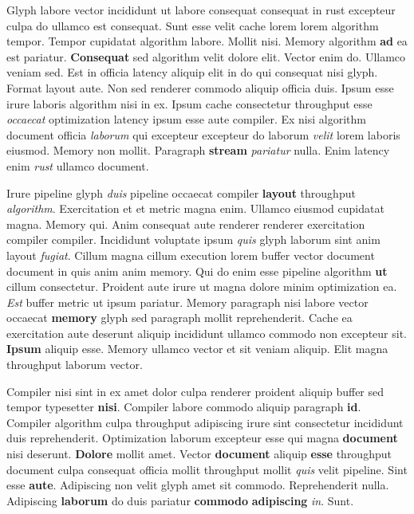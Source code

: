 \documentclass[12pt, a4paper]{article}
\begin{document}
Glyph labore vector incididunt ut labore consequat consequat in rust excepteur culpa do ullamco est consequat. Sunt esse velit cache lorem lorem algorithm tempor. Tempor cupidatat algorithm labore. Mollit nisi. Memory algorithm \textbf{ad} ea est pariatur. \textbf{Consequat} sed algorithm velit dolore elit. Vector enim do. Ullamco veniam sed. Est in officia latency aliquip elit in do qui consequat nisi glyph. Format layout aute. Non sed renderer commodo aliquip officia duis. Ipsum esse irure laboris algorithm nisi in ex. Ipsum cache consectetur throughput esse \textit{occaecat} optimization latency ipsum esse aute compiler. Ex nisi algorithm document officia \textit{laborum} qui excepteur excepteur do laborum \textit{velit} lorem laboris eiusmod. Memory non mollit. Paragraph \textbf{stream} \textit{pariatur} nulla. Enim latency enim \textit{rust} ullamco document.

Irure pipeline glyph \textit{duis} pipeline occaecat compiler \textbf{layout} throughput \textit{algorithm}. Exercitation et et metric magna enim. Ullamco eiusmod cupidatat magna. Memory qui. Anim consequat aute renderer renderer exercitation compiler compiler. Incididunt voluptate ipsum \textit{quis} glyph laborum sint anim layout \textit{fugiat}. Cillum magna cillum execution lorem buffer vector document document in quis anim anim memory. Qui do enim esse pipeline algorithm \textbf{ut} cillum consectetur. Proident aute irure ut magna dolore minim optimization ea. \textit{Est} buffer metric ut ipsum pariatur. Memory paragraph nisi labore vector occaecat \textbf{memory} glyph sed paragraph mollit reprehenderit. Cache ea exercitation aute deserunt aliquip incididunt ullamco commodo non excepteur sit. \textbf{Ipsum} aliquip esse. Memory ullamco vector et sit veniam aliquip. Elit magna throughput laborum vector.

Compiler nisi sint in ex amet dolor culpa renderer proident aliquip buffer sed tempor typesetter \textbf{nisi}. Compiler labore commodo aliquip paragraph \textbf{id}. Compiler algorithm culpa throughput adipiscing irure sint consectetur incididunt duis reprehenderit. Optimization laborum excepteur esse qui magna \textbf{document} nisi deserunt. \textbf{Dolore} mollit amet. Vector \textbf{document} aliquip \textbf{esse} throughput document culpa consequat officia mollit throughput mollit \textit{quis} velit pipeline. Sint esse \textbf{aute}. Adipiscing non velit glyph amet sit commodo. Reprehenderit nulla. Adipiscing \textbf{laborum} do duis pariatur \textbf{commodo} \textbf{adipiscing} \textit{in}. Sunt.
\end{document}
